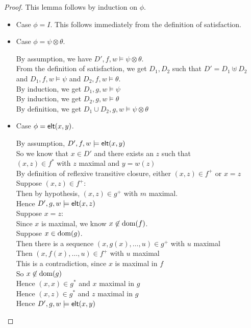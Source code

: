 \begin{proof}
This lemma follows by induction on $\phi$. 
\begin{itemize}
\item Case $\phi = I$. This follows immediately from the definition of satisfaction. 
\item Case $\phi = \psi \otimes \theta$. 
  \begin{tabbedproof}
    \oo By assumption, we have $D', f, w \models \psi \otimes \theta$. \\
    \ooo From the definition of satisfaction, we get  $D_1, D_2$ such that $D' = D_1 \uplus D_2$ \\
    \oox and $D_1, f, w \models \psi$ and $D_2, f, w \models \theta$.  \\
    \ooo By induction, we get $D_1, g, w \models \psi$ \\
    \ooo By induction, we get $D_2, g, w \models \theta$ \\
    \ooo By definition, we get $D_1 \cup D_2, g, w \models \psi \otimes \theta$ \\
  \end{tabbedproof}
\item Case $\phi = \mathsf{elt}({x}, {y})$.
  \begin{tabbedproof}
    \oo By assumption, $D', f, w \models \mathsf{elt}({x}, {y})$ \\
    \oo So we know that $x \in D'$ and there exists an $z$ such that \\
    \ox $(x,z) \in f^*$ with $z$ maximal and $y = w(z)$ \\
    \oo By definition of reflexive transitive closure, either $(x, z) \in f^+$ or $x = z$ \\
    \oo Suppose $(x,z) \in f^+$:\\
    \ooo Then by hypothesis, $(x,z) \in g^+$ with $m$ maximal.  \\
    \ooo Hence $D', g, w \models \mathsf{elt}({x}, {z})$  \\
    \oo Suppose $x = z$: \\
    \ooo Since $x$ is maximal, we know $x \not\in \mbox{dom}({f})$. \\
    \ooo Suppose $x \in \mbox{dom}({g})$. \\
    \oooo Then there is a sequence $(x, g(x), \ldots, u) \in g^+$ with $u$ maximal \\
    \oooo Then $(x, f(x), \ldots, u) \in f^+$ with $u$ maximal \\
    \oooo This is a contradiction, since $x$ is maximal in $f$ \\
    \ooo So $x \not\in \mbox{dom}({g})$ \\
    \ooo Hence $(x, x) \in g^*$ and $x$ maximal in $g$ \\
    \ooo Hence $(x, z) \in g^*$ and $z$ maximal in $g$ \\
    \ooo Hence $D', g, w \models \mathsf{elt}({x}, {y})$
  \end{tabbedproof}
\end{itemize}
\end{proof}


